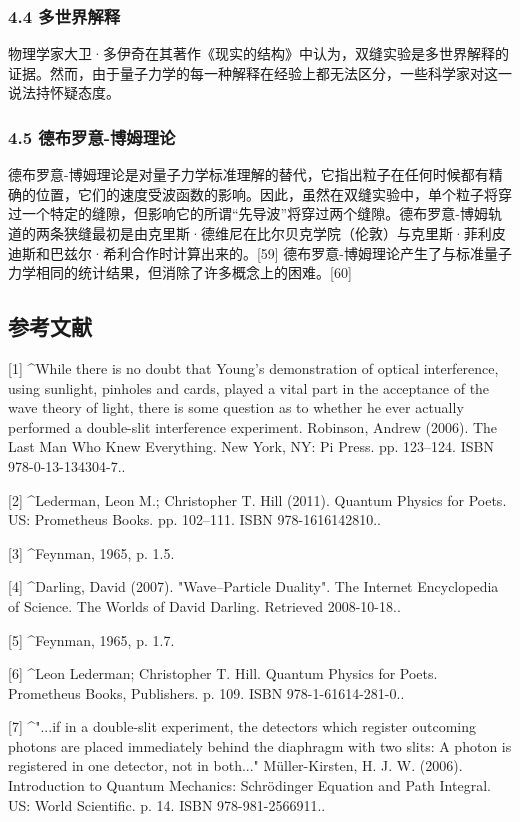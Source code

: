 \subsubsection{4.4 多世界解释}
物理学家大卫·多伊奇在其著作《现实的结构》中认为，双缝实验是多世界解释的证据。然而，由于量子力学的每一种解释在经验上都无法区分，一些科学家对这一说法持怀疑态度。
\subsubsection{4.5 德布罗意-博姆理论}
德布罗意-博姆理论是对量子力学标准理解的替代，它指出粒子在任何时候都有精确的位置，它们的速度受波函数的影响。因此，虽然在双缝实验中，单个粒子将穿过一个特定的缝隙，但影响它的所谓“先导波”将穿过两个缝隙。德布罗意-博姆轨道的两条狭缝最初是由克里斯·德维尼在比尔贝克学院（伦敦）与克里斯·菲利皮迪斯和巴兹尔·希利合作时计算出来的。[59] 德布罗意-博姆理论产生了与标准量子力学相同的统计结果，但消除了许多概念上的困难。[60]

\subsection{参考文献}
[1]
^While there is no doubt that Young's demonstration of optical interference, using sunlight, pinholes and cards, played a vital part in the acceptance of the wave theory of light, there is some question as to whether he ever actually performed a double-slit interference experiment. Robinson, Andrew (2006). The Last Man Who Knew Everything. New York, NY: Pi Press. pp. 123–124. ISBN 978-0-13-134304-7..

[2]
^Lederman, Leon M.; Christopher T. Hill (2011). Quantum Physics for Poets. US: Prometheus Books. pp. 102–111. ISBN 978-1616142810..

[3]
^Feynman, 1965, p. 1.5.

[4]
^Darling, David (2007). "Wave–Particle Duality". The Internet Encyclopedia of Science. The Worlds of David Darling. Retrieved 2008-10-18..

[5]
^Feynman, 1965, p. 1.7.

[6]
^Leon Lederman; Christopher T. Hill. Quantum Physics for Poets. Prometheus Books, Publishers. p. 109. ISBN 978-1-61614-281-0..

[7]
^"...if in a double-slit experiment, the detectors which register outcoming photons are placed immediately behind the diaphragm with two slits: A photon is registered in one detector, not in both..." Müller-Kirsten, H. J. W. (2006). Introduction to Quantum Mechanics: Schrödinger Equation and Path Integral. US: World Scientific. p. 14. ISBN 978-981-2566911..


